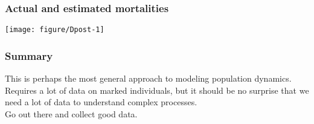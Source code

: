 \documentclass[color=usenames,dvipsnames]{beamer}\usepackage[]{graphicx}\usepackage[]{color}
\begin{document}
\begin{frame}
  \frametitle{Actual and estimated mortalities}
  \begin{center}
    \texttt{[image: figure/Dpost-1]}
  \end{center}
\end{frame}








\begin{frame}
  \frametitle{Summary}
  This is perhaps the most general approach to modeling population
  dynamics. \\
  \pause \vfill
  Requires a lot of data on marked individuals, but it should be no
  surprise that we need a lot of data to understand complex
  processes. \\ 
  \pause \vfill
  Go out there and collect good data. \\
\end{frame}
\end{document}
